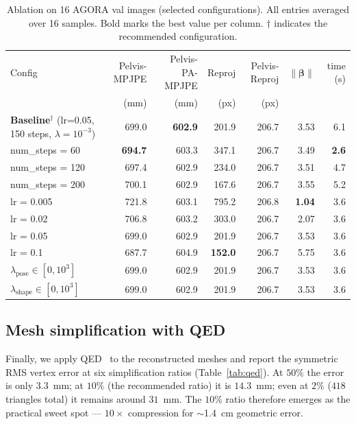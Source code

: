 \documentclass[twocolumn,10pt]{svjour3}
\begin{document}
\begin{table}[htbp]
\centering
\caption{Ablation on 16 AGORA val images (selected configurations). All entries averaged over 16 samples. Bold marks the best value per column. $\dagger$ indicates the recommended configuration.}
\label{tab:abl}
\small
\begin{tabular}{l r r r r r r}
\toprule
Config & Pelvis-MPJPE & Pelvis-PA-MPJPE & Reproj & Pelvis-Reproj & $\|\boldsymbol{\beta}\|$ & time (s)\\
 & (mm) & (mm) & (px) & (px) & & \\
\midrule
\textbf{Baseline}$^\dagger$ (lr=0.05, 150 steps, $\lambda\!=\!10^{-3}$) & 699.0 & \textbf{602.9} & 201.9 & 206.7 & 3.53 & 6.1 \\
num\_steps = 60  & \textbf{694.7} & 603.3 & 347.1 & 206.7 & 3.49 & \textbf{2.6} \\
num\_steps = 120 & 697.4 & 602.9 & 234.0 & 206.7 & 3.51 & 4.7 \\
num\_steps = 200 & 700.1 & 602.9 & 167.6 & 206.7 & 3.55 & 5.2 \\
lr = 0.005       & 721.8 & 603.1 & 795.2 & 206.8 & \textbf{1.04} & 3.6 \\
lr = 0.02        & 706.8 & 603.2 & 303.0 & 206.7 & 2.07 & 3.6 \\
lr = 0.05        & 699.0 & 602.9 & 201.9 & 206.7 & 3.53 & 3.6 \\
lr = 0.1         & 687.7 & 604.9 & \textbf{152.0} & 206.7 & 5.75 & 3.6 \\
$\lambda_{\text{pose}} \in [0,10^3]$ & 699.0 & 602.9 & 201.9 & 206.7 & 3.53 & 3.6 \\
$\lambda_{\text{shape}} \in [0,10^3]$ & 699.0 & 602.9 & 201.9 & 206.7 & 3.53 & 3.6 \\
\bottomrule
\end{tabular}
\end{table}

\subsection{Mesh simplification with QED}
Finally, we apply QED~\cite{QED} to the reconstructed meshes and report the symmetric RMS vertex error at six simplification ratios (Table~\ref{tab:qed}). At $50\%$ the error is only $3.3$~mm; at $10\%$ (the recommended ratio) it is $14.3$~mm; even at $2\%$ ($418$ triangles total) it remains around $31$~mm. The $10\%$ ratio therefore emerges as the practical sweet spot --- $10\times$ compression for $\sim$1.4~cm geometric error.
\end{document}
